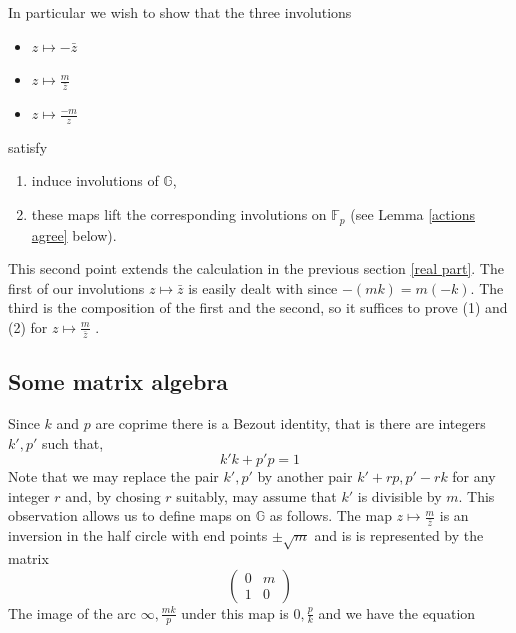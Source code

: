 \documentclass[12pt,a4paper]{amsart}
\def\GG{\mathbb{G}}
\def\fp{\mathbb{F}_p}
\begin{document}




In particular we wish to show that the 
three involutions
\begin{itemize}
	\item $z\mapsto - \bar{z}$ 
	\item $z\mapsto \frac{m}{\bar{z}}$ 
	\item $z\mapsto \frac{-m}{z}$ 
\end{itemize}
satisfy
\begin{enumerate}

	\item induce involutions of $\GG$,
	\item these maps lift the corresponding
	involutions on $\fp$ (see Lemma \ref{actions agree}
	below).

\end{enumerate}
This second point extends the calculation in the previous section
\ref{real part}.
The first of our involutions $z\mapsto\bar{z}$ 
is easily dealt with since $-(mk) = m(-k)$.
The third is the composition of the first and the second,
so it suffices to prove (1) and (2) for $z\mapsto \frac{m}{\bar{z}}$
.

\subsection{Some matrix algebra}

Since $k$ and $p$ are coprime there is a Bezout identity,
that is there are integers $k',p'$ such that,
$$k'k + p'p = 1$$
Note that we may replace the pair $k',p'$
by another pair $k'+ rp, p' -rk$ for any integer $r$
and, by chosing $r$ suitably,
may assume that $k'$ is divisible by $m$.
This observation allows us to define maps on $\GG$ as follows.
The map 
$z\mapsto \frac{m}{\bar{z}}$ is an inversion in the half circle
with end points $\pm\sqrt{m}$  and is 
is represented by the matrix
$$
\begin{pmatrix}
	0 & m \\ 1 & 0
\end{pmatrix}
$$
The image of the arc $\infty,\frac{mk}{p}$
under this map is $0, \frac{p}{k}$
and we have the equation
\end{document}
